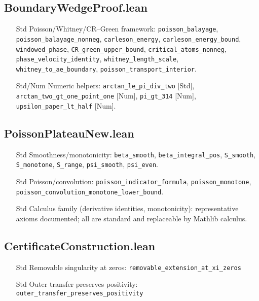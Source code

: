 \documentclass[11pt]{article}
\begin{document}
\subsection*{BoundaryWedgeProof.lean}
\begin{itemize}[leftmargin=*]
  \item [Std] Poisson/Whitney/CR--Green framework: \texttt{poisson\_balayage}, \texttt{poisson\_balayage\_nonneg}, \texttt{carleson\_energy}, \texttt{carleson\_energy\_bound}, \texttt{windowed\_phase}, \texttt{CR\_green\_upper\_bound}, \texttt{critical\_atoms\_nonneg}, \texttt{phase\_velocity\_identity}, \texttt{whitney\_length\_scale}, \texttt{whitney\_to\_ae\_boundary}, \texttt{poisson\_transport\_interior}.
  \item [Std/Num] Numeric helpers: \texttt{arctan\_le\_pi\_div\_two} [Std], \texttt{arctan\_two\_gt\_one\_point\_one} [Num], \texttt{pi\_gt\_314} [Num], \texttt{upsilon\_paper\_lt\_half} [Num].
\end{itemize}

\subsection*{PoissonPlateauNew.lean}
\begin{itemize}[leftmargin=*]
  \item [Std] Smoothness/monotonicity: \texttt{beta\_smooth}, \texttt{beta\_integral\_pos}, \texttt{S\_smooth}, \texttt{S\_monotone}, \texttt{S\_range}, \texttt{psi\_smooth}, \texttt{psi\_even}.
  \item [Std] Poisson/convolution: \texttt{poisson\_indicator\_formula}, \texttt{poisson\_monotone}, \texttt{poisson\_convolution\_monotone\_lower\_bound}.
  \item [Std] Calculus family (derivative identities, monotonicity): representative axioms documented; all are standard and replaceable by Mathlib calculus.
\end{itemize}

\subsection*{CertificateConstruction.lean}
\begin{itemize}[leftmargin=*]
  \item [Std] Removable singularity at zeros: \texttt{removable\_extension\_at\_xi\_zeros}
  \item [Std] Outer transfer preserves positivity: \texttt{outer\_transfer\_preserves\_positivity}
\end{itemize}
\end{document}
